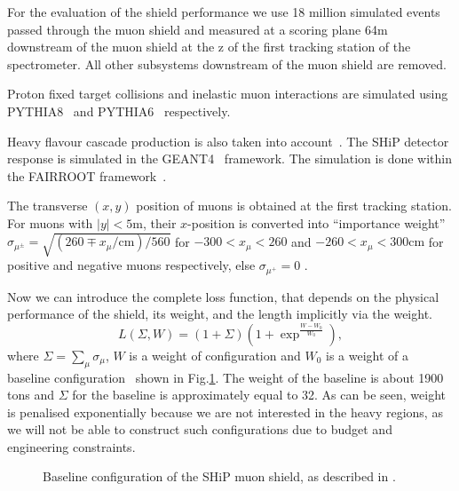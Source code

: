 \documentclass[a4paper]{jpconf}
\theoremstyle{my_theorem_style}
\numberwithin{equation}{section}
\begin{document}
For the evaluation of the shield performance we use 18 million
simulated events passed through the muon shield and measured at a
scoring plane 64m downstream of the muon shield at the z of the first
tracking station of the spectrometer. All other subsystems downstream of the
muon shield are removed.

Proton fixed target collisions  and  inelastic muon interactions
are simulated using PYTHIA8~\cite{Pythia8} and
PYTHIA6~\cite{Pythia6} respectively. 

Heavy flavour cascade production is also taken into
account~\cite{Cascade}.  The SHiP detector response is simulated in
the GEANT4~\cite{Geant4} framework. 
The simulation is done within the FAIRROOT framework~\cite{FAIRROOT}. 

The transverse $(x,y)$ position of muons is obtained at the first
tracking station. For muons with $|y| < 5\mathrm{m}$, their
$x$-position is converted into ``importance weight'' $\sigma_{\mu^{\pm}}=  \sqrt{(260 \mp
  x_\mu /  \mathrm{cm})  / 560}$ for $-300< x_\mu < 260$ and $-260<x_\mu<300
\mathrm{cm}$ for positive and negative muons respectively, else
$\sigma_{\mu^+} = 0$ \cite{Akmete:2017bpl}.  



Now we can introduce the complete loss function, that depends on the
physical performance of the shield, its weight, and the length implicitly via the weight.
\[
L(\Sigma, W) = (1 + \Sigma) (1 + \exp^{\frac{W - W_{0}}{W_{0}}}),
\]
where $\Sigma  = \sum_{\mu} \sigma_{\mu}$, $W$ is a weight of
configuration and $W_{0}$ is a weight of a baseline
configuration~\cite{Akmete:2017bpl} shown in
Fig.\ref{fig:baseline}. The weight of the baseline is about 1900 tons
and $\Sigma$ for the baseline is approximately equal to 32. As can be seen, weight is
penalised exponentially because we are not interested in the heavy
regions, as we will not be able to construct such configurations due
to budget and  engineering constraints.


\begin{figure}[tbh]
\caption{\label{fig:baseline}Baseline configuration of the SHiP muon
  shield, as described in \cite{Akmete:2017bpl}.}
\end{figure}
\end{document}

